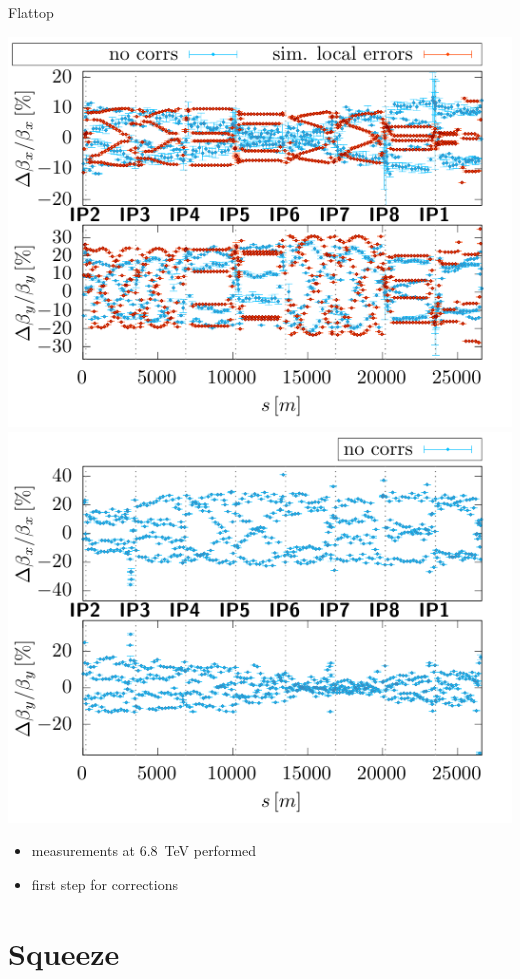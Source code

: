 \documentclass[11pt,usenames,dvipsnames,aspectratio=169]{beamer}
\begin{document}
\begin{frame}{Flattop}
    
    \includegraphics[width=0.49\linewidth]{images/flattop/b1_bb.pdf}
    \hfill
    \includegraphics[width=0.49\linewidth]{images/flattop/b2_bb.pdf}
    \begin{itemize}
        \item measurements at \SI{6.8}{TeV} performed
        \item first step for corrections
    \end{itemize}
    
\end{frame}

\section{Squeeze}
\end{document}
